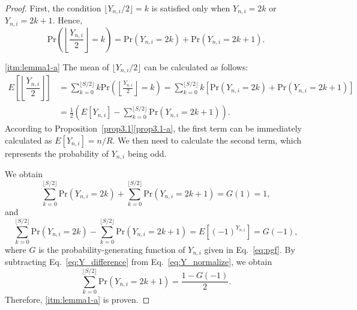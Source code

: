 \documentclass[pre, amsmath, floatfix]{revtex4-2}
\theoremstyle{plain}
\theoremstyle{definition}
\theoremstyle{remark}
\newcommand{\Prob}[1]{\mathrm{Pr}\left(#1\right)} %
\newcommand{\E}[1]{E\left[#1\right]} %
\begin{document}
\begin{proof}
First, the condition $\lfloor Y_{n,i}/2\rfloor=k$ is satisfied only when $Y_{n,i}=2k$ or $Y_{n,i}=2k+1$.
Hence,
\[
\Prob{\left\lfloor\frac{Y_{n,i}}{2}\right\rfloor=k}=\Prob{Y_{n,i}=2k}+\Prob{Y_{n,i}=2k+1}.
\]

\ref{itm:lemma1-a}
The mean of $\lfloor Y_{n,i}/2\rfloor$ can be calculated as follows:
\begin{align*}
\E{\left\lfloor\dfrac{Y_{n,i}}{2}\right\rfloor}&=\sum_{k=0}^{\lfloor S/2\rfloor}k\Prob{\left\lfloor\frac{Y_{n,i}}{2}\right\rfloor=k}
=\sum_{k=0}^{\lfloor S/2\rfloor}k[\Prob{Y_{n,i}=2k}+\Prob{Y_{n,i}=2k+1}]\\
&=\frac{1}{2}\left(\E{Y_{n,i}}-\sum_{k=0}^{\lfloor S/2\rfloor}\Prob{Y_{n,i}=2k+1}\right).
\end{align*}
According to Proposition~\ref{prop3.1}\ref{prop3.1-a}, the first term can be immediately calculated as $\E{Y_{n,i}}=n/R$.
We then need to calculate the second term, which represents the probability of $Y_{n,i}$ being odd.

We obtain
\begin{equation}
\sum_{k=0}^{\lfloor S/2\rfloor}\Prob{Y_{n,i}=2k}+\sum_{k=0}^{\lfloor S/2\rfloor}\Prob{Y_{n,i}=2k+1}=G(1)=1,
\label{eq:Y_normalize}
\end{equation}
and
\begin{equation}
\sum_{k=0}^{\lfloor S/2\rfloor}\Prob{Y_{n,i}=2k}-\sum_{k=0}^{\lfloor S/2\rfloor}\Prob{Y_{n,i}=2k+1}=\E{(-1)^{Y_{n,i}}}=G(-1),
\label{eq:Y_difference}
\end{equation}
where $G$ is the probability-generating function of $Y_{n,i}$ given in Eq.~\eqref{eq:pgf}.
By subtracting Eq.~\eqref{eq:Y_difference} from Eq.~\eqref{eq:Y_normalize}, we obtain
\begin{equation}
\sum_{k=0}^{\lfloor S/2\rfloor}\Prob{Y_{n,i}=2k+1}=\frac{1-G(-1)}{2}.
\label{eq:odd}
\end{equation}
Therefore, \ref{itm:lemma1-a} is proven.


\end{proof}
\end{document}

